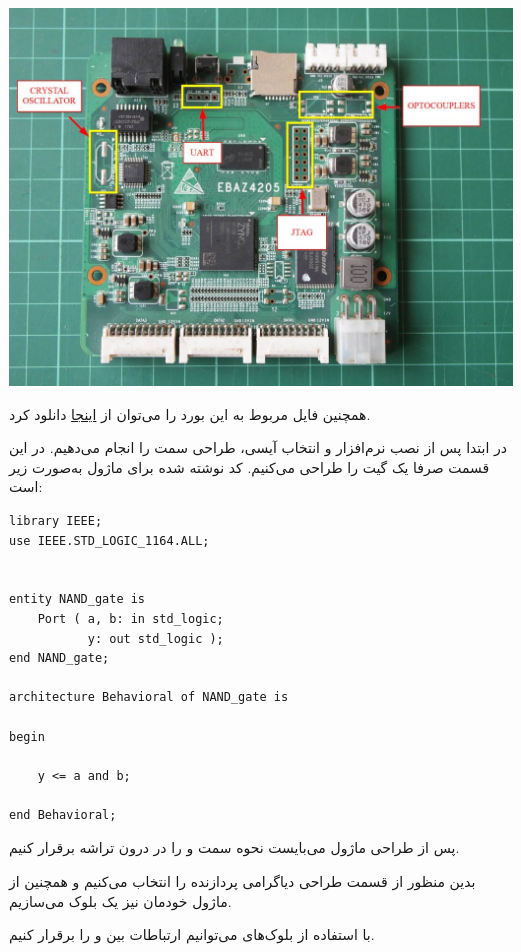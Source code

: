 \begin{center}
	\includegraphics*[width=0.7\linewidth]{pics/img2.jpg}
	\label{fig:EBAZ}
\end{center}

همچنین فایل  مربوط به این بورد را می‌توان از 
\href{https://github.com/xjtuecho/EBAZ4205/blob/master/Development/EBAZ4205.xdc}{اینجا}
دانلود کرد.


در ابتدا پس از نصب نرم‌افزار و انتخاب آیسی، طراحی سمت  را انجام می‌دهیم. در این قسمت صرفا یک گیت  را طراحی می‌کنیم. کد نوشته شده برای ماژول  به‌صورت زیر است:

\begin{latin}
\begin{lstlisting}[label=case_sens, caption=AND Module for PL]
library IEEE;
use IEEE.STD_LOGIC_1164.ALL;


entity NAND_gate is
	Port ( a, b: in std_logic;
		   y: out std_logic );
end NAND_gate;

architecture Behavioral of NAND_gate is

begin

	y <= a and b;

end Behavioral;

\end{lstlisting} 
\end{latin}

پس از طراحی ماژول  می‌بایست نحوه  سمت  و  را در درون تراشه برقرار کنیم.

بدین منظور از قسمت طراحی دیاگرامی  پردازنده  را انتخاب می‌کنیم و همچنین از ماژول  خودمان نیز یک بلوک می‌سازیم. 

با استفاده از بلوک‌های \texttt{} می‌توانیم ارتباطات بین  و  را برقرار کنیم.

